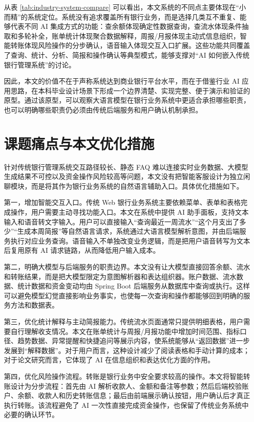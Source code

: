 \documentclass[bachelor, print]{xduthesis}
\begin{document}
从表 \ref{tab:industry-system-compare} 可以看出，本文系统的不同点主要体现在“小而精”的系统定位。系统没有追求覆盖所有银行业务，而是选择几类互不重复、能够代表不同 AI 集成方式的功能：查余额体现确定性数据查询，查流水体现条件抽取和多轮补全，账单统计体现聚合数据解释，周报/月报体现主动式信息组织，智能转账体现风险操作的分步确认，语音输入体现交互入口扩展。这些功能共同覆盖了查询、统计、分析、简报和操作确认等典型模式，能够支撑对“AI 如何嵌入传统银行管理系统”的讨论。

因此，本文的价值不在于声称系统达到商业银行平台水平，而在于借鉴行业 AI 应用思路，在本科毕业设计场景下形成一个边界清楚、实现完整、便于演示和验证的原型。通过该原型，可以观察大语言模型在银行业务系统中更适合承担哪些职责，也可以明确哪些职责仍必须由传统后端服务和用户确认机制承担。

\section{课题痛点与本文优化措施}

针对传统银行管理系统交互路径较长、静态 FAQ 难以连接实时业务数据、大模型生成结果不可控以及资金操作风险较高等问题，本文没有把智能客服设计为独立闲聊模块，而是将其作为银行业务系统的自然语言辅助入口。具体优化措施如下。

第一，增加智能交互入口。传统 Web 银行业务系统主要依赖菜单、表单和表格完成操作，用户需要主动寻找功能入口。本文在系统中提供 AI 助手面板，支持文本输入和语音转文字输入。用户可以直接输入“查询最近一周流水”“这个月支出了多少”“生成本周简报”等自然语言请求，系统通过大语言模型解析意图，并由后端服务执行对应业务查询。语音输入不单独改变业务逻辑，而是把用户语音转写为文本后复用原有 AI 请求链路，从而降低用户输入成本。

第二，明确大模型与后端服务的职责边界。本文没有让大模型直接回答余额、流水和转账结果，而是把大模型限定为意图解析器和表达组织器。账户数据、流水数据、统计数据和资金变动均由 Spring Boot 后端服务从数据库中查询或执行。这样可以避免模型幻觉直接影响业务事实，也使每一次查询和操作都能够回到明确的服务方法和数据表。

第三，优化统计解释与主动简报能力。传统流水页面通常只提供明细表格，用户需要自行理解收支情况。本文在账单统计与周报/月报功能中增加时间范围、指标口径、趋势数据、异常提醒和快捷追问等展示内容，使系统能够从“返回数据”进一步发展到“解释数据”。对于用户而言，这种设计减少了阅读表格和手动计算的成本；对于论文研究而言，它体现了 AI 在信息组织和表达优化方面的作用。

第四，优化风险操作流程。转账是银行业务中安全要求较高的操作。本文将智能转账设计为分步流程：首先由 AI 解析收款人、金额和备注等参数；然后后端校验账户、余额、收款人和历史转账信息；最后由前端展示确认按钮，用户确认后才真正执行转账。该流程避免了 AI 一次性直接完成资金操作，也保留了传统业务系统中必要的确认环节。
\end{document}
